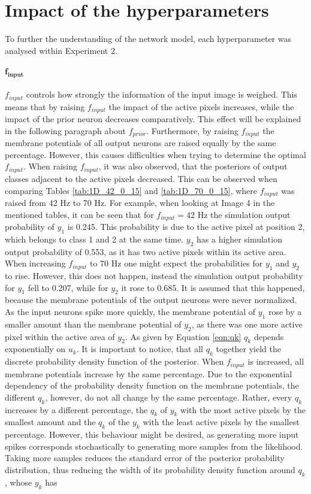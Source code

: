 \section{Impact of the hyperparameters}
\label{section:impactHyper}

To further the understanding of the network model, each hyperparameter was analysed within Experiment 2.

\paragraph{$\mathbf{f_{input}}$} $f_{input}$ controls how strongly the information of the input image is weighed. This means that by raising $f_{input}$ the impact of the active pixels increases, while the impact of the prior neuron decreases comparatively. This effect will be explained in the following paragraph about $f_{prior}$. Furthermore, by raising $f_{input}$ the membrane potentials of all output neurons are raised equally by the same percentage. However, this causes difficulties when trying to determine the optimal $f_{input}$. When raising $f_{input}$, it was also observed, that the posteriors of output classes adjacent to the active pixels decreased. This can be observed when comparing Tables \ref{tab:1D_42_0_15} and \ref{tab:1D_70_0_15}, where $f_{input}$ was raised from 42 Hz to 70 Hz. For example, when looking at Image 4 in the mentioned tables, it can be seen that for $f_{input} = 42\text{ Hz}$ the simulation output probability of $y_1$ is 0.245. This probability is due to the active pixel at position 2, which belongs to class 1 and 2 at the same time. $y_2$ has a higher simulation output probability of 0.553, as it has two active pixels within its active area. When increasing $f_{input}$ to 70 Hz one might expect the probabilities for $y_1$ and $y_2$ to rise. However, this does not happen, instead the simulation output probability for $y_1$ fell to 0.207, while for $y_2$ it rose to 0.685. It is assumed that this happened, because the membrane potentials of the output neurons were never normalized. As the input neurons spike more quickly, the membrane potential of $y_1$ rose by a smaller amount than the membrane potential of $y_2$, as there was one more active pixel within the active area of $y_2$. As given by Equation \ref{eqn:qk} $q_k$ depends exponentially on $u_k$. It is important to notice, that all $q_k$ together yield the discrete probability density function of the posterior. When $f_{input}$ is increased, all membrane potentials increase by the same percentage. Due to the exponential dependency of the probability density function on the membrane potentials, the different $q_k$, however, do not all change by the same percentage. Rather, every $q_k$ increases by a different percentage, the $q_k$ of $y_k$ with the most active pixels by the smallest amount and the $q_k$ of the $y_k$ with the least active pixels by the smallest percentage. However, this behaviour might be desired, as generating more input spikes corresponds stochastically to generating more samples from the likelihood. Taking more samples reduces the standard error of the posterior probability distribution, thus reducing the width of its probability density function around $q_k$, whose $y_k$ has 